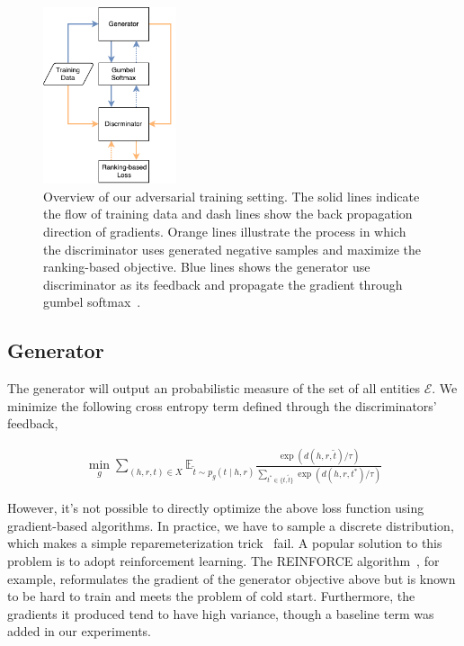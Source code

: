 \documentclass[twocolumn,a4paper,10pt,preprint,3p]{elsarticle}
\begin{document}
\begin{figure}[t]
    \centering
    \includegraphics[width=0.35\textwidth]{images/overview.pdf}
    \caption{Overview of our adversarial training setting. The solid lines indicate the flow of training data and dash lines show the back propagation direction of gradients. Orange lines illustrate the process in which the discriminator uses generated negative samples and maximize the ranking-based objective. Blue lines shows the generator use discriminator as its feedback and propagate the gradient through gumbel softmax~\cite{GumbelSoftmax_Jiang_2016}.}
\label{system-overview}
\end{figure}


\subsection{Generator}

The generator will output an probabilistic measure of the set of all entities $\mathcal{E}$. We minimize the following cross entropy term defined through the discriminators' feedback,

\begin{align}
    \min_g \sum_{(h, r, t)\in X}
        \mathbb{E}_{\tilde t \sim p_g(t \mid h, r)}
            \frac{\exp(d(h, r, \tilde t) / \tau)}
                 {\sum_{t^* \in \{ t, \tilde t\}} \exp(d(h, r, t^*) / \tau)} \label{eq:g_loss}
\end{align}

However, it's not possible to directly optimize the above loss function using gradient-based algorithms. In practice, we have to sample a discrete distribution, which makes a simple reparemeterization trick~\cite{VAE} fail. A popular solution to this problem is to adopt reinforcement learning. The REINFORCE algorithm~\cite{Williams_1992}, for example, reformulates the gradient of the generator objective above but is known to be hard to train and meets the problem of cold start. Furthermore, the gradients it produced tend to have high variance, though a baseline term was added in our experiments.
\end{document}
